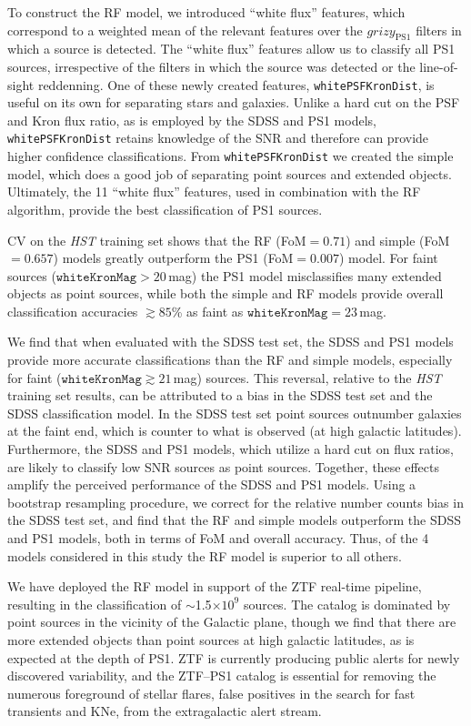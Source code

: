 \documentclass[twocolumn]{aastex62}
\begin{document}
\begin{CJK*}{UTF8}{gbsn}
To construct the RF model, we introduced ``white flux'' features, which
correspond to a weighted mean of the relevant features over the
$grizy_{\mathrm {PS1}}$ filters in which a source is detected. The ``white
flux'' features allow us to classify all PS1 sources, irrespective of the
filters in which the source was detected or the line-of-sight reddenning.
One of these newly created features, \texttt{whitePSFKronDist}, is useful on
its own for separating stars and galaxies. Unlike a hard cut on the PSF and
Kron flux ratio, as is employed by the SDSS and PS1 models,
\texttt{whitePSFKronDist} retains knowledge of the SNR and therefore can
provide higher confidence classifications. From \texttt{whitePSFKronDist} we
created the simple model, which does a good job of separating point sources
and extended objects. Ultimately, the 11 ``white flux'' features, used in
combination with the RF algorithm, provide the best classification of PS1
sources.

CV on the \textit{HST} training set shows that the RF (FoM$ = 0.71$) and
simple (FoM$ = 0.657$) models greatly outperform the PS1 (FoM$ = 0.007$)
model. For faint sources ($\mathtt{whiteKronMag} > 20$\,mag) the PS1 model
misclassifies many extended objects as point sources, while both the simple
and RF models provide overall classification accuracies $\gtrsim 85$\% as
faint as $\mathtt{whiteKronMag} = 23$\,mag.

We find that when evaluated with the SDSS test set, the SDSS and PS1 models
provide more accurate classifications than the RF and simple models,
especially for faint ($\mathtt{whiteKronMag} \gtrsim 21$\,mag) sources. This
reversal, relative to the \textit{HST} training set results, can be
attributed to a bias in the SDSS test set and the SDSS classification model.
In the SDSS test set point sources outnumber galaxies at the faint end,
which is counter to what is observed (at high galactic latitudes).
Furthermore, the SDSS and PS1 models, which utilize a hard cut on flux
ratios, are likely to classify low SNR sources as point sources. Together,
these effects amplify the perceived performance of the SDSS and PS1 models.
Using a bootstrap resampling procedure, we correct for the relative number
counts bias in the SDSS test set, and find that the RF and simple models
outperform the SDSS and PS1 models, both in terms of FoM and overall
accuracy. Thus, of the 4 models considered in this study the RF model is
superior to all others.

We have deployed the RF model in support of the ZTF real-time pipeline,
resulting in the classification of $\sim$1.5$\times 10^{9}$ sources. The
catalog is dominated by point sources in the vicinity of the Galactic plane,
though we find that there are more extended objects than point sources at
high galactic latitudes, as is expected at the depth of PS1. ZTF is
currently producing public alerts for newly discovered variability, and the
ZTF--PS1 catalog is essential for removing the numerous foreground of
stellar flares, false positives in the search for fast transients and KNe,
from the extragalactic alert stream.


\end{CJK*}
\end{document}
